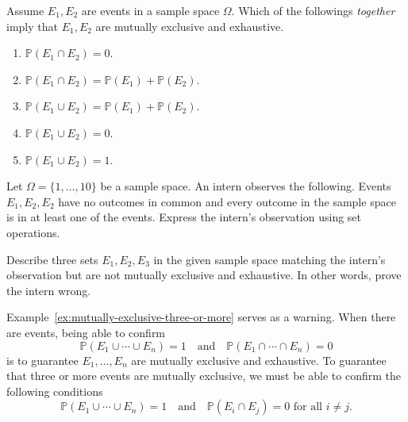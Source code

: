 \documentclass[../main.tex]{subfiles}
\begin{document}
\begin{example}
  Assume \(E_{1}, E_{2}\) are events in a sample space \(\Omega\).  Which of the followings \emph{together} imply that \(E_{1}, E_{2}\) are mutually exclusive and exhaustive. 
  \begin{multicols}{2}
    \begin{enumerate}[label=(\alph*)]
      \item \(\mathbb{P}(E_{1} \cap E_{2}) = 0\).
      \item \(\mathbb{P}(E_{1} \cap E_{2}) = \mathbb{P}(E_{1}) + \mathbb{P}(E_{2})\).
      \item \(\mathbb{P}(E_{1} \cup E_{2}) = \mathbb{P}(E_{1}) + \mathbb{P}(E_{2})\).
      \item \(\mathbb{P}(E_{1} \cup E_{2}) = 0\).
      \item \(\mathbb{P}(E_{1} \cup E_{2}) = 1\).
    \end{enumerate}
  \end{multicols}

\end{example}


\begin{example} \label{ex:mutually-exclusive-three-or-more}
  Let \(\Omega = \{1,\ldots,10\}\) be a sample space.  An intern observes the following. Events \(E_{1}, E_{2}, E_{2}\) have no outcomes in common and every outcome in the sample space is in at least one of the events. Express the intern's observation using set operations.

  Describe three sets \(E_{1}, E_{2}, E_{3}\) in the given sample space matching the intern's observation but are not mutually exclusive and exhaustive.  In other words, prove the intern wrong.

  \faExclamationTriangle{} Example~\ref{ex:mutually-exclusive-three-or-more} serves as a warning. When there are  events, being able to confirm
  \[
    \mathbb{P}(E_{1} \cup \cdots \cup E_{n}) = 1 \quad\text{and}\quad \mathbb{P}(E_{1} \cap \cdots \cap E_{n}) = 0
  \]
  is  to guarantee \(E_{1}, \ldots, E_{n}\) are mutually exclusive and exhaustive. To guarantee that three or more events are mutually exclusive, we must be able to confirm the following conditions
  \[
    \mathbb{P}(E_{1} \cup \cdots \cup E_{n}) = 1 \quad\text{and}\quad \mathbb{P}(E_{i} \cap E_{j}) = 0 \text{ for all } i \ne j.
  \]
\end{example}
\end{document}
